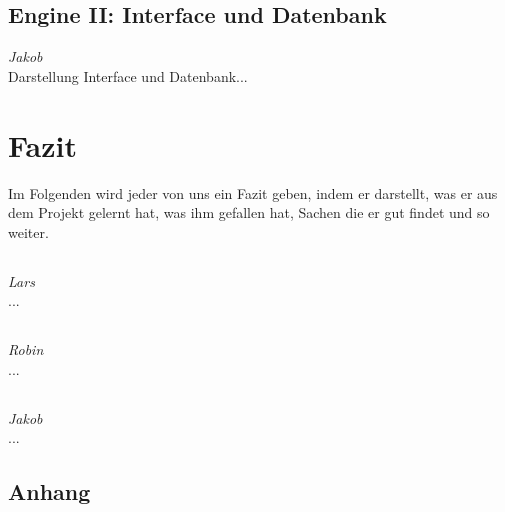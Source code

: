 \documentclass[12pt,a4paper,bibliography=totocnumbered,listof=totocnumbered]{scrartcl}
\begin{document}
\subsection{Engine II: Interface und Datenbank}
\emph{Jakob}\\
Darstellung Interface und Datenbank...
\pagebreak
\section{Fazit}
\label{sec:Fazit}
Im Folgenden wird jeder von uns ein Fazit geben, indem er darstellt, was er aus dem Projekt gelernt hat, was ihm gefallen hat, Sachen die er gut findet und so weiter.

\subsection{}
\emph{Lars}\\
...

\subsection{}
\emph{Robin}\\
...

\subsection{}
\emph{Jakob}\\
...

\pagebreak


\renewcommand\refname{Literaturverzeichnis}


\pagebreak


\setcounter{page}{1}

\begin{appendix}

\section*{Anhang}
{}


\end{appendix}
\end{document}
